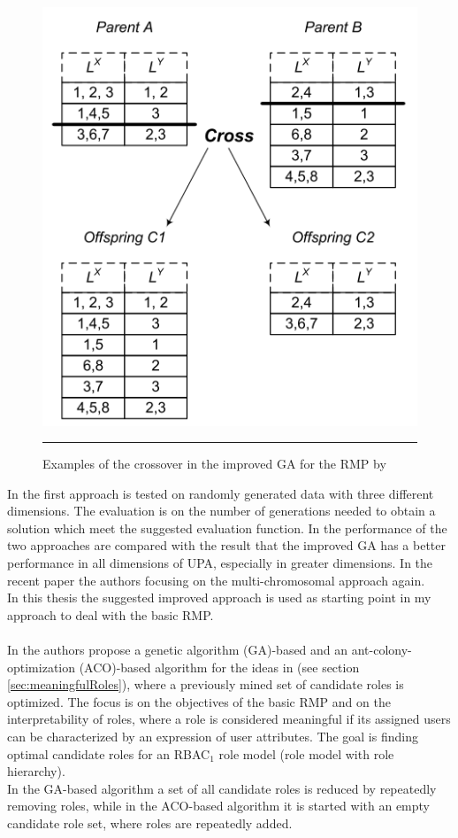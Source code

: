 \begin{figure}[H]
    \centering
    \includegraphics[scale=0.8]{./Figures/crossover.png}
    \rule{20em}{0.5pt}
    \caption{Examples of the crossover in the improved GA for the RMP by \cite{saenko2012design}}
    \label{fig:crossover}
\end{figure}
In \cite{Igor} the first approach is tested on randomly generated data with three different dimensions. The evaluation is on the number of generations needed to obtain a solution which meet the suggested evaluation function. In \cite{saenko2012design} the performance of the two approaches are compared with the result that the improved GA has a better performance in all dimensions of UPA, especially in greater dimensions. In the recent paper \cite{Kotenko:2015} the authors focusing on the multi-chromosomal approach again.\\
In this thesis the suggested improved approach is used as starting point in my approach to deal with the basic RMP.\\\\
In \cite{DuChang} the authors propose a genetic algorithm (GA)-based and an ant-colony-optimization (ACO)-based algorithm for the ideas in \cite{Xu} (see section \ref{sec:meaningfulRoles}), where a previously mined set of candidate roles is optimized. The focus is on the objectives of the basic RMP and on the interpretability of roles, where a role is considered meaningful if its assigned users can be characterized by an expression of user attributes. The goal is finding optimal candidate roles for an RBAC$_1$ role model (role model with role hierarchy).\\
In the GA-based algorithm a set of all candidate roles is reduced by repeatedly removing roles, while in the ACO-based algorithm it is started with an empty candidate role set, where roles are repeatedly added.

